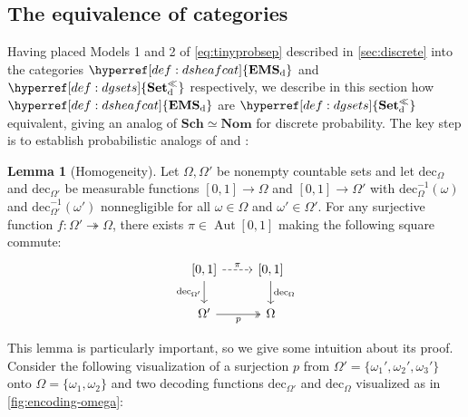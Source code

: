 \documentclass[
  sigconf,
  screen, ]{acmart}
\theoremstyle{definition}
\newtheorem{lemma}[theorem]{Lemma}
\newcommand\Aut{\operatorname{Aut}}
\newcommand\nref[2]{\hyperref[#1]{#2}} \newcommand\checkhigh{{\huge{\color{red}\textbf{TODO: check}}}}
\newcommand\agoodnamecat{\mathbf{Set}^\ll}
\newcommand\goodsheafcat{\mathbf{EMS}}
\newcommand\Sch{{\nref{def:Sch}{\mathbf{Sch}}}}
\newcommand\dec{\mathrm{dec}}
\newcommand\Nom{{\nref{def:Nom}{\mathbf{Nom}}}}
\newcommand\dauti{\nref{def:dauti}{\Aut[0,1]}}
\newcommand\discsubscript{_{\rm d}}
\newcommand\dgsets{{\nref{def:dgsets}{\agoodnamecat\discsubscript}}}
\newcommand\dsheafcat{{\nref{def:dsheafcat}{\goodsheafcat\discsubscript}}}
\begin{document}
\subsection{The equivalence of categories} \label{sec:discrete-eqv}

Having placed Models 1 and 2 of \ref{eq:tinyprobsep} described in \cref{sec:discrete}
into the categories $\dsheafcat$ and $\dgsets$ respectively,
we describe in this section how $\dsheafcat$ are $\dgsets$ equivalent,
giving an analog of $\Sch\simeq\Nom$ for discrete probability.
The key step is to establish probabilistic analogs
of \Homogeneity{} and \Correspondence{}:

\begin{lemma}[Homogeneity] \label{def:DHomogeneity}
  Let $\Omega,\Omega'$ be nonempty countable sets
  and let $\dec_\Omega$ and $\dec_{\Omega'}$
  be measurable functions $[0,1]\to\Omega$ and $[0,1]\to\Omega'$
  with $\dec_\Omega^{-1}(\omega)$ and $\dec_{\Omega'}^{-1}(\omega')$
  nonnegligible for all $\omega\in\Omega$ and $\omega'\in\Omega'$.
  For any surjective function $f : \Omega'\twoheadrightarrow\Omega$,
  there exists $\pi\in\dauti$
  making the following square commute:
  \[\begin{tikzcd}
  {[0,1]} \arrow[d, "\dec_{\Omega'}"'] \arrow[r, "\pi", dashed] & {[0,1]} \arrow[d, "\dec_\Omega"] \\
  \Omega' \arrow[r, "p"', two heads]                            & \Omega                          
  \end{tikzcd}\]
\end{lemma}

This lemma is particularly important, so we give some intuition about its proof.
Consider the following visualization of a surjection $p$ from 
$\Omega' = \{\omega_1', \omega_2', \omega_3'\}$ onto $\Omega = \{\omega_1, \omega_2\}$
and
two decoding functions $\dec_{\Omega'}$ and $\dec_\Omega$ visualized as
in \ref{fig:encoding-omega}:
\end{document}
